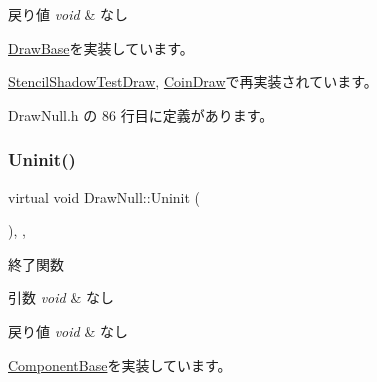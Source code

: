 \begin{DoxyRetVals}{戻り値}
{\em void} & なし \\
\hline
\end{DoxyRetVals}


\mbox{\hyperlink{class_draw_base_a3978252914ddde12197ea4577356bf25}{Draw\+Base}}を実装しています。



\mbox{\hyperlink{class_stencil_shadow_test_draw_a0f697b6dad67048c7f8916a53cca6b1c}{Stencil\+Shadow\+Test\+Draw}}, \mbox{\hyperlink{class_coin_draw_a66c03acd675ac1820977cb21015abfdb}{Coin\+Draw}}で再実装されています。



 Draw\+Null.\+h の 86 行目に定義があります。

\mbox{\label{class_draw_null_a12d44e341c7364b5ab9cdd661dc16187}} 
\subsubsection{\texorpdfstring{Uninit()}{Uninit()}}
{\footnotesize\ttfamily virtual void Draw\+Null\+::\+Uninit (\begin{DoxyParamCaption}{ }\end{DoxyParamCaption})\hspace{0.3cm}{\ttfamily [inline]}, {\ttfamily [override]}, {\ttfamily [virtual]}}



終了関数 


\begin{DoxyParams}{引数}
{\em void} & なし \\
\hline
\end{DoxyParams}

\begin{DoxyRetVals}{戻り値}
{\em void} & なし \\
\hline
\end{DoxyRetVals}


\mbox{\hyperlink{class_component_base_a9f42beaf0383d6f629819579cab4de57}{Component\+Base}}を実装しています。



